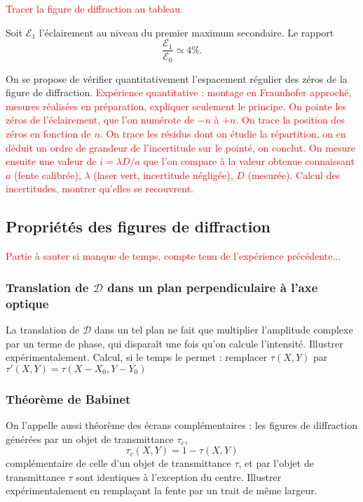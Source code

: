 \documentclass[11pt,a4paper]{report}
\begin{document}
\textcolor{red}{Tracer la figure de diffraction au tableau.} 

Soit $\mathcal{E}_1$ l'éclairement au niveau du premier maximum secondaire. Le rapport
\begin{equation}
	\frac{\mathcal{E}_1}{\mathcal{E}_0} \simeq 4\%.
\end{equation}

On se propose de vérifier quantitativement l'espacement régulier des zéros de la figure de diffraction. \textcolor{red}{Expérience quantitative : montage en Fraunhofer approché, mesures réalisées en préparation, expliquer seulement le principe. On pointe les zéros de l'éclairement, que l'on numérote de $-n$ à $+n$. On trace la position des zéros en fonction de $n$. On trace les résidus dont on étudie la répartition, on en déduit un ordre de grandeur de l'incertitude sur le pointé, on conclut. On mesure ensuite une valeur de $i = \lambda D/a$ que l'on compare à la valeur obtenue connaissant $a$ (fente calibrée), $\lambda$ (laser vert, incertitude négligée), $D$ (mesurée). Calcul des incertitudes, montrer qu'elles se recouvrent.}

\subsection{Propriétés des figures de diffraction}
\textcolor{red}{Partie à sauter si manque de temps, compte tenu de l'expérience précédente...}

\subsubsection{Translation de $\mathcal{D}$ dans un plan perpendiculaire à l'axe optique}

La translation de $\mathcal{D}$ dans un tel plan ne fait que multiplier l'amplitude complexe par un terme de phase, qui disparaît une fois qu'on calcule l'intensité. Illustrer expérimentalement. Calcul, si le temps le permet : remplacer $\tau(X,Y)$ par $\tau'(X,Y) = \tau(X-X_0,Y-Y_0)$

\subsubsection{Théorème de Babinet}

On l'appelle aussi théorème des écrans complémentaires : les figures de diffraction générées par un objet de transmittance $\tau_c$, 
\begin{equation}
	\tau_c(X,Y) = 1 - \tau(X,Y)
\end{equation}
complémentaire de celle d'un objet de transmittance $\tau$, et par l'objet de transmittance $\tau$ sont identiques à l'exception du centre. Illustrer expérimentalement en remplaçant la fente par un trait de même largeur.
\end{document}
